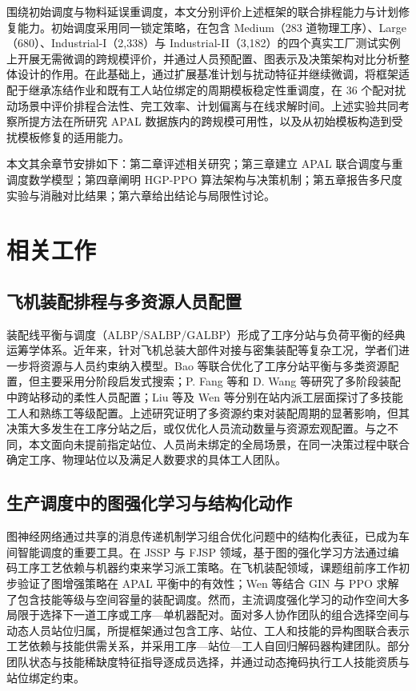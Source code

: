 \documentclass[journal,10pt]{IEEEtran}
\begin{document}
围绕初始调度与物料延误重调度，本文分别评价上述框架的联合排程能力与计划修复能力。初始调度采用同一锁定策略，在包含 Medium（283 道物理工序）、Large（680）、Industrial-I（2,338）与 Industrial-II（3,182）的四个真实工厂测试实例上开展无需微调的跨规模评价，并通过人员预配置、图表示及决策架构对比分析整体设计的作用。在此基础上，通过扩展基准计划与扰动特征并继续微调，将框架适配于继承冻结作业和既有工人站位绑定的周期模板稳定性重调度，在 36 个配对扰动场景中评价排程合法性、完工效率、计划偏离与在线求解时间。上述实验共同考察所提方法在所研究 APAL 数据族内的跨规模可用性，以及从初始模板构造到受扰模板修复的适用能力。

本文其余章节安排如下：第二章评述相关研究；第三章建立 APAL 联合调度与重调度数学模型；第四章阐明 HGP-PPO 算法架构与决策机制；第五章报告多尺度实验与消融对比结果；第六章给出结论与局限性讨论。

\section{相关工作}\label{sec:related_work}

\subsection{飞机装配排程与多资源人员配置}\label{sec:rel_apal}

装配线平衡与调度（ALBP/SALBP/GALBP）形成了工序分站与负荷平衡的经典运筹学体系\cite{becker2006, boysen2007, battaia2013}。近年来，针对飞机总装大部件对接与密集装配等复杂工况，学者们进一步将资源与人员约束纳入模型。Bao 等\cite{bao2023, bao2023b}联合优化了工序分站平衡与多类资源配置，但主要采用分阶段启发式搜索；P. Fang 等\cite{fang2021flexible}和 D. Wang 等\cite{wang2024}研究了多阶段装配中跨站移动的柔性人员配置；Liu 等\cite{liu2025}及 Wen 等\cite{wen2026}分别在站内派工层面探讨了多技能工人和熟练工等级配置。上述研究证明了多资源约束对装配周期的显著影响，但其决策大多发生在工序分站之后，或仅优化人员流动数量与资源宏观配置。与之不同，本文面向未提前指定站位、人员尚未绑定的全局场景，在同一决策过程中联合确定工序、物理站位以及满足人数要求的具体工人团队。

\subsection{生产调度中的图强化学习与结构化动作}\label{sec:rel_gnn_rl}

图神经网络通过共享的消息传递机制学习组合优化问题中的结构化表征，已成为车间智能调度的重要工具\cite{cappart2023}。在 JSSP 与 FJSP 领域，基于图的强化学习方法通过编码工序工艺依赖与机器约束来学习派工策略\cite{zhang2020, park2021, wang2024flexible}。在飞机装配领域，课题组前序工作\cite{ai2025}初步验证了图增强策略在 APAL 平衡中的有效性；Wen 等\cite{wen2026b}结合 GIN 与 PPO 求解了包含技能等级与空间容量的装配调度。然而，主流调度强化学习的动作空间大多局限于选择下一道工序或工序---单机器配对。面对多人协作团队的组合选择空间与动态人员站位归属，所提框架通过包含工序、站位、工人和技能的异构图联合表示工艺依赖与技能供需关系，并采用工序---站位---工人自回归解码器构建团队。部分团队状态与技能稀缺度特征指导逐成员选择，并通过动态掩码执行工人技能资质与站位绑定约束。
\end{document}

